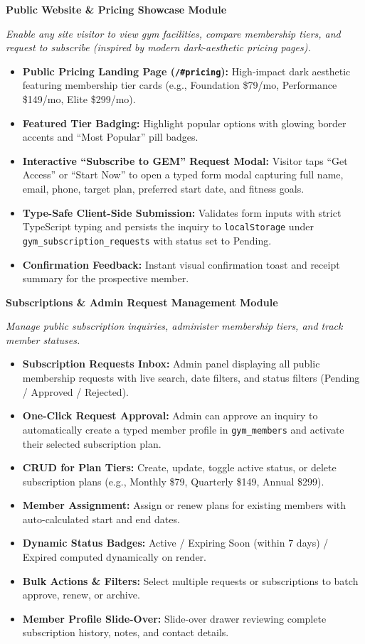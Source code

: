 \documentclass[11pt,a4paper]{article}
\newcommand{\modulebox}[4]{%
\begin{tcolorbox}[
    enhanced,
    breakable,
    colback=primaryblue!2,
    colframe=primaryblue,
    arc=0.8mm,
    boxrule=0pt,
    leftrule=3.5pt,
    left=10pt, right=10pt, top=10pt, bottom=10pt
]
{\large\bfseries\color{primaryblue}\faIcon{#1}\; #2}\par
\vspace{4pt}
\small\textit{#3}
\vspace{6pt}
\begin{itemize}[leftmargin=*, itemsep=3pt, topsep=3pt]
#4
\end{itemize}
\end{tcolorbox}
\vspace{8pt}
}
\begin{document}
\modulebox{globe}{Public Website \& Pricing Showcase Module}%
{Enable any site visitor to view gym facilities, compare membership tiers, and request to subscribe (inspired by modern dark-aesthetic pricing pages).}{
  \item \textbf{Public Pricing Landing Page (\texttt{/\#pricing}):} High-impact dark aesthetic featuring membership tier cards (e.g., Foundation \$79/mo, Performance \$149/mo, Elite \$299/mo).
  \item \textbf{Featured Tier Badging:} Highlight popular options with glowing border accents and ``Most Popular'' pill badges.
  \item \textbf{Interactive ``Subscribe to GEM'' Request Modal:} Visitor taps ``Get Access'' or ``Start Now'' to open a typed form modal capturing full name, email, phone, target plan, preferred start date, and fitness goals.
  \item \textbf{Type-Safe Client-Side Submission:} Validates form inputs with strict TypeScript typing and persists the inquiry to \texttt{localStorage} under \texttt{gym\_subscription\_requests} with status set to \textcolor{warningyellow}{Pending}.
  \item \textbf{Confirmation Feedback:} Instant visual confirmation toast and receipt summary for the prospective member.
}

\modulebox{id-card}{Subscriptions \& Admin Request Management Module}%
{Manage public subscription inquiries, administer membership tiers, and track member statuses.}{
  \item \textbf{Subscription Requests Inbox:} Admin panel displaying all public membership requests with live search, date filters, and status filters (\textcolor{warningyellow}{Pending} / \textcolor{successgreen}{Approved} / \textcolor{dangerred}{Rejected}).
  \item \textbf{One-Click Request Approval:} Admin can approve an inquiry to automatically create a typed member profile in \texttt{gym\_members} and activate their selected subscription plan.
  \item \textbf{CRUD for Plan Tiers:} Create, update, toggle active status, or delete subscription plans (e.g., Monthly \$79, Quarterly \$149, Annual \$299).
  \item \textbf{Member Assignment:} Assign or renew plans for existing members with auto-calculated start and end dates.
  \item \textbf{Dynamic Status Badges:} \textcolor{successgreen}{Active} / \textcolor{warningyellow}{Expiring Soon (within 7 days)} / \textcolor{dangerred}{Expired} computed dynamically on render.
  \item \textbf{Bulk Actions \& Filters:} Select multiple requests or subscriptions to batch approve, renew, or archive.
  \item \textbf{Member Profile Slide-Over:} Slide-over drawer reviewing complete subscription history, notes, and contact details.
}
\newpage
\end{document}
